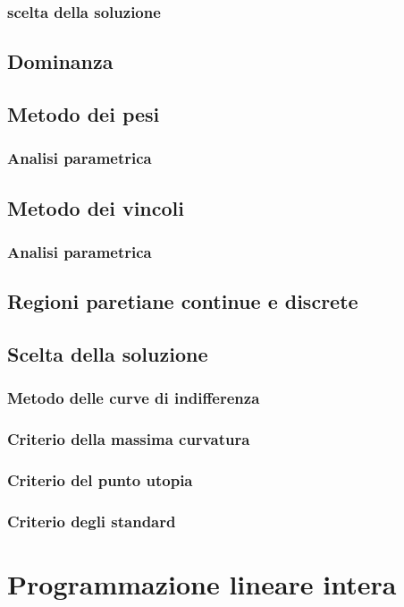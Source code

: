 \documentclass[11pt, oneside]{article}   	%
\begin{document}
\subsubsection{scelta della soluzione}
\subsection{Dominanza}
\subsection{Metodo dei pesi}
\subsubsection{Analisi parametrica}
\subsection{Metodo dei vincoli}
\subsubsection{Analisi parametrica}
\subsection{Regioni paretiane continue e discrete}
\subsection{Scelta della soluzione}
\subsubsection{Metodo delle curve di indifferenza}
\subsubsection{Criterio della massima curvatura}
\subsubsection{Criterio del punto utopia}
\subsubsection{Criterio degli standard}

\section{Programmazione lineare intera}
\end{document}
